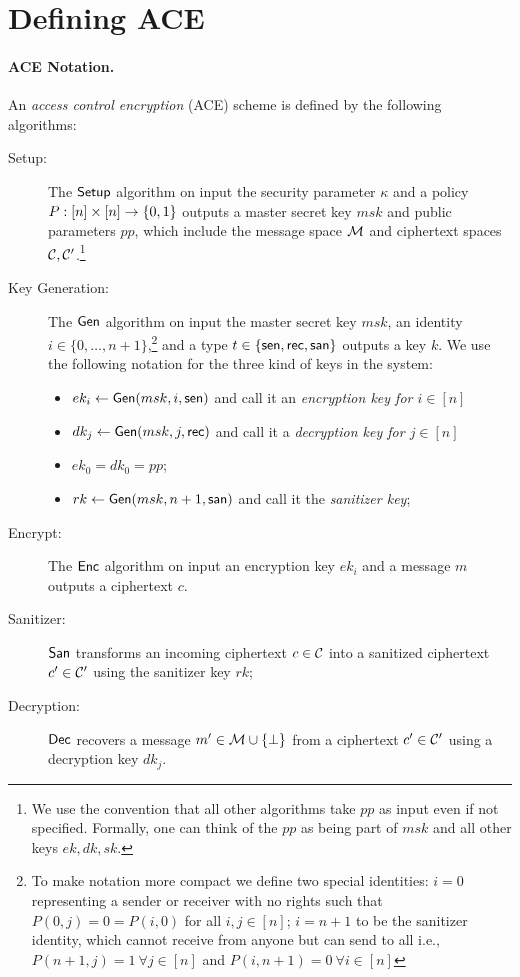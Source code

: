 \documentclass{llncs}
\begin{document}
\section{Defining ACE}\label{sec:definition}

\paragraph{ACE Notation.} An \emph{access control encryption} (ACE) scheme is defined by the following algorithms:
\begin{description}
\item[Setup:] The $\mathsf{Setup}$ algorithm on input the security parameter $\kappa$ and a policy $P : [n]\times [n]\to \{0,1\}$ outputs a master secret key $msk$ and public parameters $pp$, which include the message space $\mathcal{M}$ and ciphertext spaces $\mathcal{C},\mathcal{C}'$.\footnote{We use the convention that all other algorithms take $pp$ as input even if not specified. Formally, one can think of the $pp$ as being part of $msk$ and all other keys $ek,dk,sk$.} 

\item[Key Generation:] The $\mathsf{Gen}$ algorithm on input the master secret key $msk$, an identity $i\in \{0,\dots,n+1\}$,\footnote{To make notation more compact we define two special identities: $i=0$ representing a sender or receiver with no rights such that $P(0,j) = 0 = P(i,0)$ for all $i,j \in [n]$; $i=n+1$ to be the sanitizer identity, which cannot receive from anyone but can send to all i.e., $P(n+1,j)=1 \ \forall j\in[n]$ and $P(i,n+1)=0 \ \forall i\in[n]$} and a type $t\in \{\mathsf{sen},\mathsf{rec},\mathsf{san}\}$ outputs a key $k$. We use the following notation for the three kind of keys in the system:
	\begin{itemize}
	\item $ek_i\leftarrow \mathsf{Gen}(msk,i,\mathsf{sen})$ and call it an \emph{encryption key for $i\in[n]$} 
	\item $dk_j\leftarrow \mathsf{Gen}(msk,j,\mathsf{rec})$ and call it a \emph{decryption key for $j\in[n]$} 
	\item $ek_0=dk_0=pp$;
	\item $rk \leftarrow \mathsf{Gen}(msk,n+1,\mathsf{san})$ and call it the \emph{sanitizer key};
	\end{itemize}

\item[Encrypt:] The $\mathsf{Enc}$ algorithm on input an encryption key $ek_i$ and a message $m$ outputs a ciphertext $c$. 

\item[Sanitizer:] $\mathsf{San}$ transforms an incoming ciphertext $c\in \mathcal{C}$ into a sanitized ciphertext $c'\in\mathcal{C}'$ using the sanitizer key $rk$;

\item[Decryption:] $\mathsf{Dec}$ recovers a message $m' \in \mathcal{M} \cup \{\bot\}$ from a ciphertext $c'\in\mathcal{C}'$ using a decryption key $dk_j$. \end{description}
\end{document}

